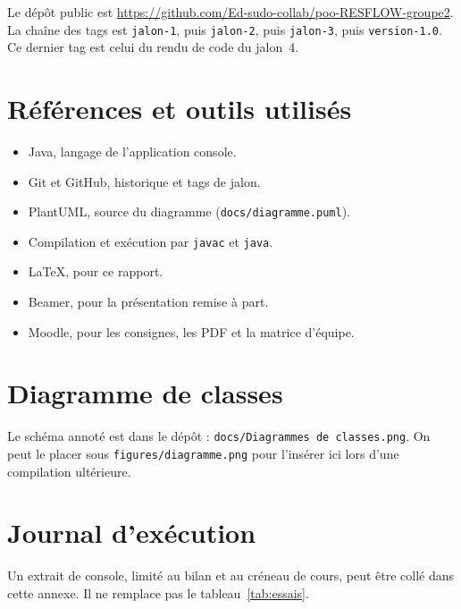 \documentclass[11pt,a4paper]{article}
\begin{document}
Le dépôt public est \url{https://github.com/Ed-sudo-collab/poo-RESFLOW-groupe2}. La chaîne des tags est \texttt{jalon-1}, puis \texttt{jalon-2}, puis \texttt{jalon-3}, puis \texttt{version-1.0}. Ce dernier tag est celui du rendu de code du jalon~4.

\section{Références et outils utilisés}

\begin{itemize}
\item Java, langage de l'application console.
\item Git et GitHub, historique et tags de jalon.
\item PlantUML, source du diagramme (\texttt{docs/diagramme.puml}).
\item Compilation et exécution par \texttt{javac} et \texttt{java}.
\item LaTeX, pour ce rapport.
\item Beamer, pour la présentation remise à part.
\item Moodle, pour les consignes, les PDF et la matrice d'équipe.
\end{itemize}

\appendix
\section{Diagramme de classes}
Le schéma annoté est dans le dépôt : \texttt{docs/Diagrammes de classes.png}. On peut le placer sous \texttt{figures/diagramme.png} pour l'insérer ici lors d'une compilation ultérieure.

\section{Journal d'exécution}
Un extrait de console, limité au bilan et au créneau de cours, peut être collé dans cette annexe. Il ne remplace pas le tableau~\ref{tab:essais}.
\end{document}
